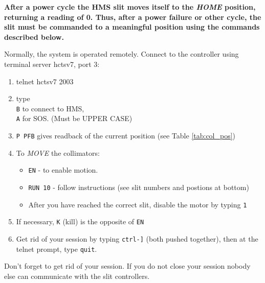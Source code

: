 {{\bf After a power cycle the HMS slit moves itself to the {\it HOME} position,
returning a reading of 0. Thus, after a power failure or other cycle, the slit
must be commanded to a meaningful position using the commands described below.}


Normally, the system is operated remotely. Connect to the controller
using terminal server hctsv7, port 3:

\begin{minipage}{6in}
\begin{enumerate}
\item telnet hctsv7 2003
\item type \texttt{\\B} to connect to HMS, \texttt{\\A} for SOS. (Must be UPPER CASE)
\item {\tt P PFB} gives readback of the current position (see Table \ref{tab:col_pos})
\item To {\em MOVE} the collimators:
   \begin{itemize}
	\item {\tt EN} - to enable motion.
	\item {\tt RUN 10} - follow instructions (see slit numbers and postions at bottom)
	\item After you have reached the correct slit, disable the motor by typing {\tt 1}

   \end{itemize}
\item If necessary, \texttt{K} (kill) is the opposite of \texttt{EN}
\item Get rid of your session by typing \texttt{ctrl-]} (both pushed together), then
at the telnet prompt, type \texttt{quit}.
\end{enumerate}
\end{minipage}

Don't forget to get rid of your session. If you do not close your session nobody
else can communicate with the slit controllers.


}
